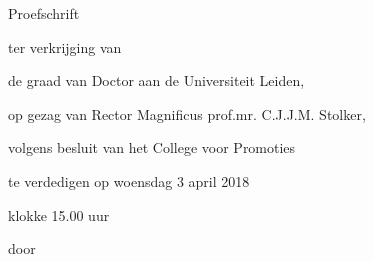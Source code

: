  \begin{titlepage}

\begin{center}








\vspace*{2\bigskipamount}

{\makeatletter
\titlestyle\bfseries\LARGE\@title
\makeatother}

{\makeatletter
\ifx\@subtitle\undefined\else
    \bigskip
    \titlefont\titleshape\Large\@subtitle
\fi
\makeatother}


\bigskip
\bigskip
\bigskip
\bigskip
\bigskip
\bigskip

{\Large\titlefont Proefschrift}

\bigskip
\bigskip

ter verkrijging van

de graad van Doctor aan de Universiteit Leiden,

op gezag van Rector Magnificus prof.mr. C.J.J.M. Stolker,

volgens besluit van het College voor Promoties

te verdedigen op woensdag 3 april 2018

klokke 15.00 uur

\bigskip
\bigskip

door

\bigskip
\bigskip


\end{center}
\end{titlepage}
